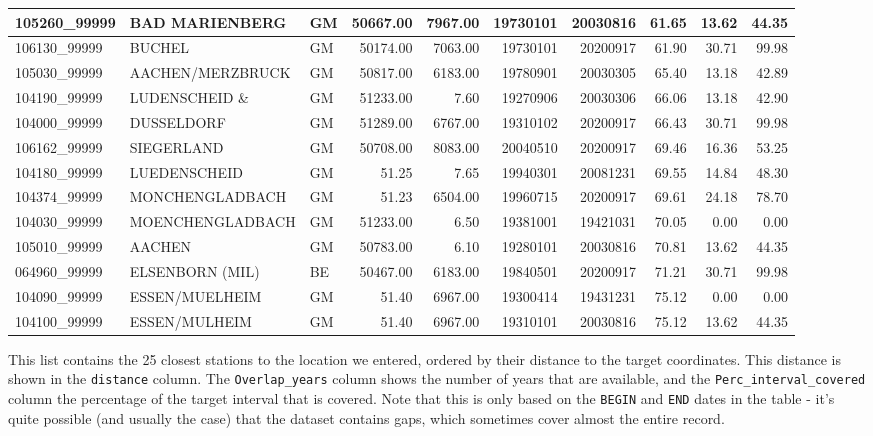 \documentclass[
]{book}
\begin{document}
\begin{tabular}{l|l|l|r|r|r|r|r|r|r}
\hline
105260\_99999 & BAD MARIENBERG & GM & 50667.00 & 7967.00 & 19730101 & 20030816 & 61.65 & 13.62 & 44.35\\
\hline
106130\_99999 & BUCHEL & GM & 50174.00 & 7063.00 & 19730101 & 20200917 & 61.90 & 30.71 & 99.98\\
\hline
105030\_99999 & AACHEN/MERZBRUCK & GM & 50817.00 & 6183.00 & 19780901 & 20030305 & 65.40 & 13.18 & 42.89\\
\hline
104190\_99999 & LUDENSCHEID       \& & GM & 51233.00 & 7.60 & 19270906 & 20030306 & 66.06 & 13.18 & 42.90\\
\hline
104000\_99999 & DUSSELDORF & GM & 51289.00 & 6767.00 & 19310102 & 20200917 & 66.43 & 30.71 & 99.98\\
\hline
106162\_99999 & SIEGERLAND & GM & 50708.00 & 8083.00 & 20040510 & 20200917 & 69.46 & 16.36 & 53.25\\
\hline
104180\_99999 & LUEDENSCHEID & GM & 51.25 & 7.65 & 19940301 & 20081231 & 69.55 & 14.84 & 48.30\\
\hline
104374\_99999 & MONCHENGLADBACH & GM & 51.23 & 6504.00 & 19960715 & 20200917 & 69.61 & 24.18 & 78.70\\
\hline
104030\_99999 & MOENCHENGLADBACH & GM & 51233.00 & 6.50 & 19381001 & 19421031 & 70.05 & 0.00 & 0.00\\
\hline
105010\_99999 & AACHEN & GM & 50783.00 & 6.10 & 19280101 & 20030816 & 70.81 & 13.62 & 44.35\\
\hline
064960\_99999 & ELSENBORN (MIL) & BE & 50467.00 & 6183.00 & 19840501 & 20200917 & 71.21 & 30.71 & 99.98\\
\hline
104090\_99999 & ESSEN/MUELHEIM & GM & 51.40 & 6967.00 & 19300414 & 19431231 & 75.12 & 0.00 & 0.00\\
\hline
104100\_99999 & ESSEN/MULHEIM & GM & 51.40 & 6967.00 & 19310101 & 20030816 & 75.12 & 13.62 & 44.35\\
\hline
\end{tabular}
\endgroup{}

This list contains the 25 closest stations to the location we entered, ordered by their distance to the target coordinates. This distance is shown in the \texttt{distance} column. The \texttt{Overlap\_years} column shows the number of years that are available, and the \texttt{Perc\_interval\_covered} column the percentage of the target interval that is covered. Note that this is only based on the \texttt{BEGIN} and \texttt{END} dates in the table - it's quite possible (and usually the case) that the dataset contains gaps, which sometimes cover almost the entire record.
\end{document}
